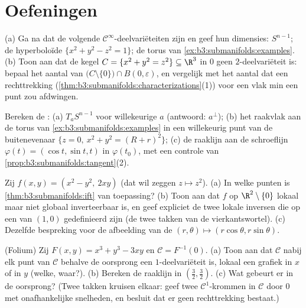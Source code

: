 \section{Oefeningen}

\begin{exercise}[$\star$]\label{exo:b3:submanifolds:1}
(a) Ga na dat de volgende $\mathcal C^\infty$-deelvariëteiten
zijn en geef hun dimensies: $S^{n-1}$; de hyperboloïde $\{x^2 +
y^2 - z^2 = 1\}$; de torus van
\cref{ex:b3:submanifolds:examples}.
(b) Toon aan dat de kegel $C = \{x^2 + y^2 = z^2\} \subseteq
\R^3$ in $0$ geen $2$-deelvariëteit is: bepaal het aantal
 van
$\bigl(C\setminus\{0\}\bigr)\cap B(0,\varepsilon)$, en vergelijk
met het aantal dat een rechttrekking
(\cref{thm:b3:submanifolds:characterizations}(1)) voor een vlak
min een punt zou afdwingen.
\end{exercise}

\begin{exercise}[$\star$]\label{exo:b3:submanifolds:2}
Bereken de :
(a) $T_aS^{n-1}$ voor willekeurige $a$ (antwoord: $a^\perp$);
(b) het raakvlak aan de torus van
\cref{ex:b3:submanifolds:examples} in een willekeurig punt van de
buitenevenaar $\{z = 0,\ x^2 + y^2 = (R + r)^2\}$;
(c) de raaklijn aan de schroeflijn $\varphi(t) = (\cos t, \sin t,
t)$ in $\varphi(t_0)$, met een controle van
\cref{prop:b3:submanifolds:tangent}(2).
\end{exercise}

\begin{exercise}[$\star\star$]\label{exo:b3:submanifolds:3}
Zij $f(x, y) = (x^2 - y^2,\ 2xy)$ (dat wil zeggen $z \mapsto
z^2$).
(a) In welke punten is \cref{thm:b3:submanifolds:ift} van
toepassing?
(b) Toon aan dat $f$ op $\R^2\setminus\{0\}$ lokaal maar niet
globaal inverteerbaar is, en geef expliciet de twee lokale
inversen die op een  van $(1, 0)$ gedefinieerd zijn (de
twee takken van de vierkantswortel).
(c) Dezelfde bespreking voor de afbeelding van de
 $(r, \theta) \mapsto (r\cos\theta,
r\sin\theta)$.
\end{exercise}

\begin{exercise}[$\star\star$]\label{exo:b3:submanifolds:4}
(Folium) Zij $F(x,y) = x^3 + y^3 - 3xy$ en $\mathcal C =
F^{-1}(0)$.
(a) Toon aan dat $\mathcal C$ nabij elk punt van $\mathcal C$
behalve de oorsprong een $1$-deelvariëteit is, lokaal een grafiek
in $x$ of in $y$ (welke, waar?).
(b) Bereken de raaklijn in $(\frac32, \frac32)$.
(c) Wat gebeurt er in de oorsprong? (Twee takken kruisen elkaar:
geef twee $\mathcal C^1$-krommen in $\mathcal C$ door $0$ met
onafhankelijke snelheden, en besluit dat er geen rechttrekking
bestaat.)
\end{exercise}

